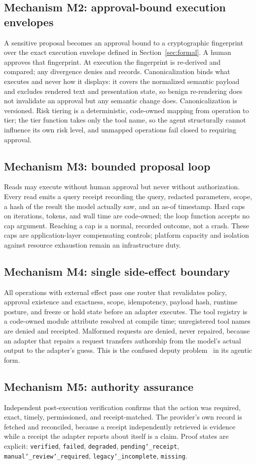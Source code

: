\documentclass[11pt,letterpaper]{article}
\newcommand{\mech}[2]{\subsection{Mechanism #1: #2}\label{mech:#1}}
\begin{document}
\mech{M2}{approval-bound execution envelopes}
A sensitive proposal becomes an approval bound to a cryptographic fingerprint over the exact execution envelope defined in Section~\ref{sec:formal}. A human approves that fingerprint. At execution the fingerprint is re-derived and compared; any divergence denies and records. Canonicalization binds what executes and never how it displays: it covers the normalized semantic payload and excludes rendered text and presentation state, so benign re-rendering does not invalidate an approval but any semantic change does. Canonicalization is versioned. Risk tiering is a deterministic, code-owned mapping from operation to tier; the tier function takes only the tool name, so the agent structurally cannot influence its own risk level, and unmapped operations fail closed to requiring approval.

\mech{M3}{bounded proposal loop}
Reads may execute without human approval but never without authorization. Every read emits a query receipt recording the query, redacted parameters, scope, a hash of the result the model actually saw, and an as-of timestamp. Hard caps on iterations, tokens, and wall time are code-owned; the loop function accepts no cap argument. Reaching a cap is a normal, recorded outcome, not a crash. These caps are application-layer compensating controls; platform capacity and isolation against resource exhaustion remain an infrastructure duty.

\mech{M4}{single side-effect boundary}
All operations with external effect pass one router that revalidates policy, approval existence and exactness, scope, idempotency, payload hash, runtime posture, and freeze or hold state before an adapter executes. The tool registry is a code-owned module attribute resolved at compile time; unregistered tool names are denied and receipted. Malformed requests are denied, never repaired, because an adapter that repairs a request transfers authorship from the model's actual output to the adapter's guess. This is the confused deputy problem~\cite{hardy1988} in its agentic form.

\mech{M5}{authority assurance}
Independent post-execution verification confirms that the action was required, exact, timely, permissioned, and receipt-matched. The provider's own record is fetched and reconciled, because a receipt independently retrieved is evidence while a receipt the adapter reports about itself is a claim. Proof states are explicit: \texttt{verified}, \texttt{failed}, \texttt{degraded}, \texttt{pending\char`_receipt}, \texttt{manual\char`_review\char`_required}, \texttt{legacy\char`_incomplete}, \texttt{missing}.
\end{document}
